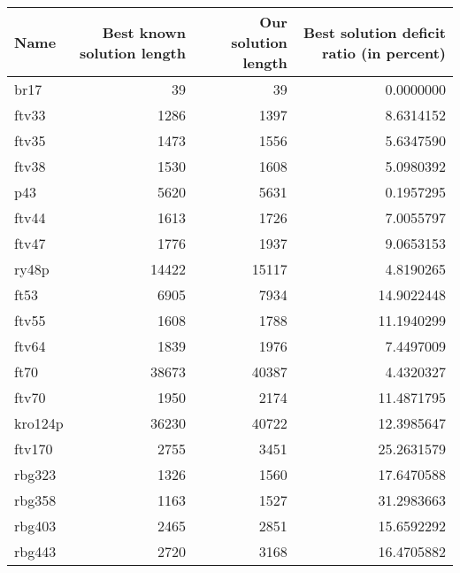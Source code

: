 \begin{table}
\centering
\begin{tabular}{l|r|r|r}
\hline
Name & Best known solution length & Our solution length & Best solution deficit ratio (in percent)\\
\hline
br17 & 39 & 39 & 0.0000000\\
\hline
ftv33 & 1286 & 1397 & 8.6314152\\
\hline
ftv35 & 1473 & 1556 & 5.6347590\\
\hline
ftv38 & 1530 & 1608 & 5.0980392\\
\hline
p43 & 5620 & 5631 & 0.1957295\\
\hline
ftv44 & 1613 & 1726 & 7.0055797\\
\hline
ftv47 & 1776 & 1937 & 9.0653153\\
\hline
ry48p & 14422 & 15117 & 4.8190265\\
\hline
ft53 & 6905 & 7934 & 14.9022448\\
\hline
ftv55 & 1608 & 1788 & 11.1940299\\
\hline
ftv64 & 1839 & 1976 & 7.4497009\\
\hline
ft70 & 38673 & 40387 & 4.4320327\\
\hline
ftv70 & 1950 & 2174 & 11.4871795\\
\hline
kro124p & 36230 & 40722 & 12.3985647\\
\hline
ftv170 & 2755 & 3451 & 25.2631579\\
\hline
rbg323 & 1326 & 1560 & 17.6470588\\
\hline
rbg358 & 1163 & 1527 & 31.2983663\\
\hline
rbg403 & 2465 & 2851 & 15.6592292\\
\hline
rbg443 & 2720 & 3168 & 16.4705882\\
\hline
\end{tabular}
\end{table}
